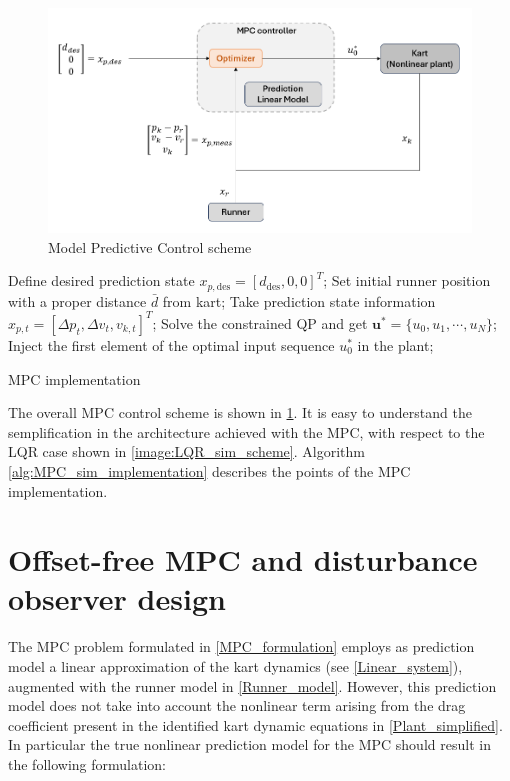\documentclass[a4paper,12pt,oneside]{book}
\begin{document}
\begin{figure}
	\centering
	\includegraphics[width=1.0\textwidth]{MPC_sim_scheme.png}
	\caption{Model Predictive Control scheme}
	\label{image:MPC_sim_scheme}
\end{figure}

\begin{algorithm}
\begin{algorithmic}[1]
	\State Define desired prediction state $x_{p,\text{des}} = [d_{\text{des}}, 0, 0]^T$;
	\State Set initial runner position with a proper distance $\bar{d}$ from kart;
		\State Take prediction state information $x_{p,t} = [\Delta p_t, \Delta v_t, v_{k,t}]^T$;
		\State Solve the constrained QP and get $\boldsymbol{u}^* = \{u_0, u_1, \cdots, u_N\}$; 
		\State Inject the first element of the optimal input sequence $u_0^*$ in the plant;
	\EndFor
\caption{MPC implementation}
\label{alg:MPC_sim_implementation}
\end{algorithmic}
\end{algorithm}

The overall MPC control scheme is shown in \ref{image:MPC_sim_scheme}.
It is easy to understand the semplification in the architecture achieved with the MPC, with respect to the LQR case shown in \ref{image:LQR_sim_scheme}.
 Algorithm \ref{alg:MPC_sim_implementation} describes the points of the MPC implementation.

\section{Offset-free MPC and disturbance observer design}
The MPC problem formulated in \ref{MPC_formulation} employs as prediction model a linear approximation of the kart dynamics (see \ref{Linear_system}), augmented with the runner model in \ref{Runner_model}.
However, this prediction model does not take into account the nonlinear term arising from the drag coefficient present in the identified kart dynamic equations in \ref{Plant_simplified}.
In particular the true nonlinear prediction model for the MPC should result in the following formulation:
\end{document}
